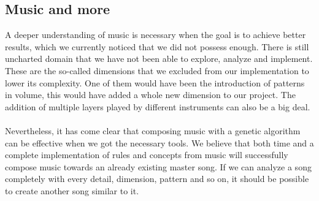 \documentclass[a4paper]{article}
\begin{document}
\subsection{Music and more}
A deeper understanding of music is necessary when the goal is to achieve better results, which we currently noticed that we did not possess enough. There is still uncharted domain that we have not been able to explore, analyze and implement. These are the so-called dimensions that we excluded from our implementation to lower its complexity. One of them would have been the introduction of patterns in volume, this would have added a whole new dimension to our project. The addition of multiple layers played by different instruments can also be a big deal.
\\\\
Nevertheless, it has come clear that composing music with a genetic algorithm can be effective when we got the necessary tools. We believe that both time and a complete implementation of rules and concepts from music will successfully compose music towards an already existing master song. If we can analyze a song completely with every detail, dimension, pattern and so on, it should be possible to create another song similar to it.
\end{document}
